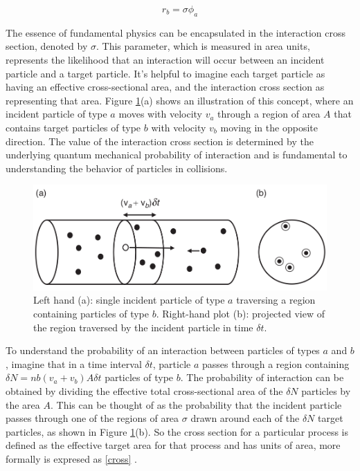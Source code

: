 \begin{equation*}
  r_{b}=\sigma \phi_{a}
\end{equation*}

The essence of fundamental physics can be encapsulated in the interaction cross section, denoted by $\sigma$. This parameter, which is measured in area units, represents the likelihood that an interaction will occur between an incident particle and a target particle. It's helpful to imagine each target particle as having an effective cross-sectional area, and the interaction cross section as representing that area. Figure \ref{cross_section}(a) shows an illustration of this concept, where an incident particle of type $a$ moves with velocity $v_{a}$ through a region of area $A$ that contains target particles of type $b$ with velocity $v_{b}$ moving in the opposite direction. The value of the interaction cross section is determined by the underlying quantum mechanical probability of interaction and is fundamental to understanding the behavior of particles in collisions. \cite{thomson_2013}

\begin{center}
  \begin{figure}[h!]
    \centering
\includegraphics[scale=.35]{Chapter1/cross_section.png} 
 \caption[Cross section illustration]{Left hand (a): single incident particle of type $a$ traversing a region containing particles of type $b$. Right-hand plot (b): projected view of the region traversed by the incident particle in time $\delta t$.}
    \label{cross_section}
  \end{figure}
\end{center}

To understand the probability of an interaction between particles of types $a$ and $b$, imagine that in a time interval $\delta t$, particle $a$ passes through a region containing $\delta N= nb(v_{a}+v_{b}) A \delta t$ particles of type $b$. The probability of interaction can be obtained by dividing the effective total cross-sectional area of the $\delta N$ particles by the area $A$. This can be thought of as the probability that the incident particle passes through one of the regions of area $\sigma$ drawn around each of the $\delta N$ target particles, as shown in Figure \ref{cross_section}(b). So the cross section for a particular process is defined as the effective target area for that process and has units of area, more formally is expresed as \ref{cross} \cite{thomson_2013}.


